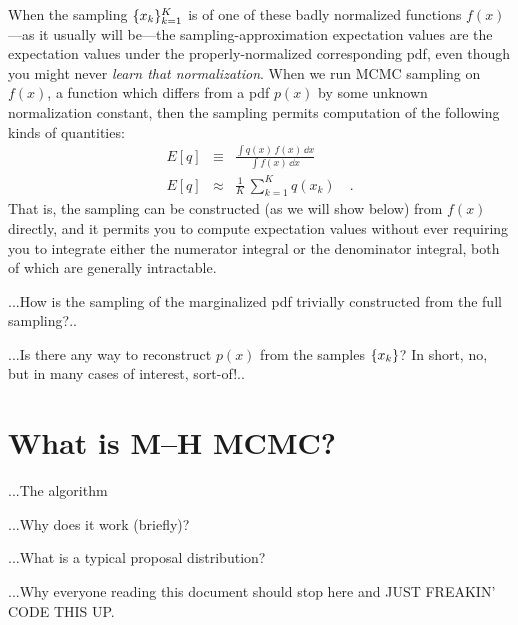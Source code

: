 \documentclass[12pt,twoside,pdftex]{article}
\begin{document}
When the sampling $\{{x_k}\}_{k=1}^K$ is of one of these badly
normalized functions $f(x)$---as it usually will be---the
sampling-approximation expectation values are the expectation values
under the properly-normalized corresponding pdf, even though you might
never \emph{learn that normalization}.
When we run MCMC sampling on $f(x)$, a function which differs from a
pdf $p(x)$ by some unknown normalization constant, then the sampling
permits computation of the following kinds of quantities:
\begin{eqnarray}
E[q] &\equiv& \frac{\int q(x)\,f(x)\,\dd x}{\int f(x)\,\dd x}
\\
E[q] &\approx& \frac{1}{K}\,\sum_{k=1}^K q(x_k)
\quad .
\end{eqnarray}
That is, the sampling can be constructed (as we will show below) from
$f(x)$ directly, and it permits you to compute expectation values
without ever requiring you to integrate either the numerator integral
or the denominator integral, both of which are generally
intractable.

...How is the sampling of the marginalized pdf trivially constructed from the full sampling?..

...Is there any way to reconstruct $p(x)$ from the samples
$\{{x_k}\}$?  In short, no, but in many cases of interest, sort-of!..

\section{What is M--H MCMC?}

...The algorithm

...Why does it work (briefly)?

...What is a typical proposal distribution?

...Why everyone reading this document should stop here and JUST FREAKIN' CODE THIS UP.

%
%
\end{document}
